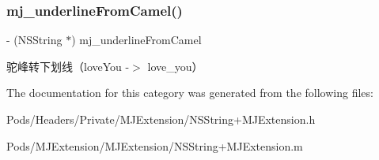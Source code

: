 \subsubsection{\texorpdfstring{mj\+\_\+underline\+From\+Camel()}{mj\_underlineFromCamel()}\hspace{0.1cm}{\footnotesize\ttfamily [3/3]}}
{\footnotesize\ttfamily -\/ (N\+S\+String $\ast$) mj\+\_\+underline\+From\+Camel \begin{DoxyParamCaption}{ }\end{DoxyParamCaption}}

驼峰转下划线（love\+You -\/$>$ love\+\_\+you） 

The documentation for this category was generated from the following files\+:\begin{DoxyCompactItemize}
\item 
Pods/\+Headers/\+Private/\+M\+J\+Extension/N\+S\+String+\+M\+J\+Extension.\+h\item 
Pods/\+M\+J\+Extension/\+M\+J\+Extension/N\+S\+String+\+M\+J\+Extension.\+m\end{DoxyCompactItemize}
